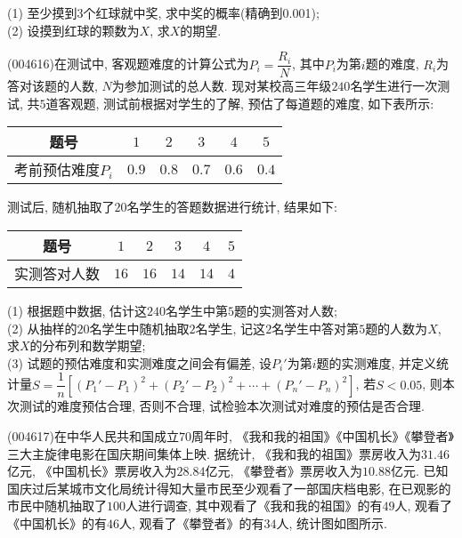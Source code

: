 (1) 至少摸到$3$个红球就中奖, 求中奖的概率(精确到0.001);\\
(2) 设摸到红球的颗数为$X$, 求$X$的期望.
\item (004616)在测试中, 客观题难度的计算公式为$P_i=\dfrac{R_i}N$, 其中$P_i$为第$i$题的难度, $R_i$为答对该题的人数, $N$为参加测试的总人数. 现对某校高三年级$240$名学生进行一次测试, 共$5$道客观题, 测试前根据对学生的了解, 预估了每道题的难度, 如下表所示:
\begin{center}
    \begin{tabular}{|c|c|c|c|c|c|}
        \hline
        题号 & $1$ & $2$ & $3$ & $4$ & $5$ \\ \hline
        考前预估难度$P_i$ & $0.9$ & $0.8$ & $0.7$ & $0.6$ & $0.4$ \\ \hline       
    \end{tabular}
\end{center}
测试后, 随机抽取了$20$名学生的答题数据进行统计, 结果如下:
\begin{center}
    \begin{tabular}{|c|c|c|c|c|c|}
        \hline
        题号 & $1$ & $2$ & $3$ & $4$ & $5$ \\ \hline
        实测答对人数 & $16$ & $16$ & $14$ & $14$ & $4$ \\ \hline       
    \end{tabular}
\end{center}
(1) 根据题中数据, 估计这$240$名学生中第$5$题的实测答对人数;\\
(2) 从抽样的$20$名学生中随机抽取$2$名学生, 记这$2$名学生中答对第$5$题的人数为$X$, 求$X$的分布列和数学期望;\\
(3) 试题的预估难度和实测难度之间会有偏差, 设$P_i'$为第$i$题的实测难度, 并定义统计量$S=\dfrac 1n[(P_1'-P_1)^2+(P_2'-P_2)^2+\cdots+(P_n'-P_n)^2]$, 若$S<0.05$, 则本次测试的难度预估合理, 否则不合理, 试检验本次测试对难度的预估是否合理.
\item (004617)在中华人民共和国成立$70$周年时, 《我和我的祖国》《中国机长》《攀登者》三大主旋律电影在国庆期间集体上映. 据统计, 《我和我的祖国》票房收入为$31.46$亿元, 《中国机长》票房收入为$28.84$亿元, 《攀登者》票房收入为$10.88$亿元. 已知国庆过后某城市文化局统计得知大量市民至少观看了一部国庆档电影, 在已观影的市民中随机抽取了$100$人进行调查, 其中观看了《我和我的祖国》的有$49$人, 观看了《中国机长》的有$46$人, 观看了《攀登者》的有$34$人, 统计图如图所示.
\begin{center}
\end{center}
